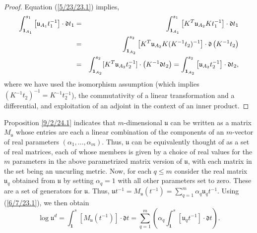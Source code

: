 \documentclass{amsart}
\numberwithin{equation}{section}
\theoremstyle{definition}
\numberwithin{theorem}{section}
\begin{document}
\begin{proof} 
Equation (\ref{5/23/23.1}) implies,
\begin{eqnarray*} \int_{{\bf 1}_{A_1}}^{s_1} \left[\mathfrak{u}_{A_1}t_1^{-1}\right]\cdot \mathfrak{d}t_1 &=& \int_{{\bf 1}_{A_1}}^{s_1} \left[ K^T\mathfrak{u}_{A_2}Kt_1^{-1}\right]\cdot \mathfrak{d}t_1 \\ &=& 
\int_{{\bf 1}_{A_2}}^{s_2} \left[ K^T\mathfrak{u}_{A_2}K (K^{-1}t_2)^{-1}\right]\cdot \mathfrak{d}\left(K^{-1}t_2\right) \\ &=& \int_{{\bf 1}_{A_2}}^{s_2} [K^T\mathfrak{u}_{A_2}t_2^{-1}]\cdot \left(K^{-1}\mathfrak{d}t_2\right) = \int_{{\bf 1}_{A_2}}^{s_2} \left[\mathfrak{u}_{A_2}t_2^{-1}\right]\cdot \mathfrak{d}t_2, 
\end{eqnarray*} 
where we have used the isomorphism assumption (which implies $(K^{-1}t_2)^{-1} = K^{-1}t_2^{-1}$), the commutativity of a linear transformation and a differential, and exploitation of an adjoint in the context of an inner product.
\end{proof}

Proposition \ref{9/2/24.1} indicates that $m$-dimensional $\mathfrak{u}$ can be written as a matrix $M_\mathfrak{u}$ whose entries are each a linear combination of the components of an $m$-vector of real parameters $(\alpha_1, \dots, \alpha_m)$.   Thus, $\mathfrak{u}$ can be equivalently thought of as a set of real matrices, each of whose members is given by a choice of real values for the $m$ parameters in the above parametrized matrix version of $\mathfrak{u}$, with each matrix in the set being an uncurling metric.  Now, for each $q\le m$ consider the real matrix  $\mathfrak{u}_q$ obtained from $\mathfrak{u}$ by setting $\alpha_q =1$ with all other parameters set to zero.  These are a set of generators for $\mathfrak{u}$. Thus, $\mathfrak{u}t^{-1} = M_{\mathfrak{u}}(t^{-1}) = \sum_{q=1}^m \alpha_q \mathfrak{u}_q t^{-1}$.   Using (\ref{6/7/23.1}), we then obtain \begin{equation}\label{9/26/23.1} \log  \mathfrak{u}^d = \int_{\mathbf{1}}^s [M_{\mathfrak{u}} (t^{-1})]\cdot \mathfrak{d}t =\sum_{q=1}^m \left(\alpha_q \int_{\mathbf{1}}^s [\mathfrak{u}_q t^{-1}]\cdot \mathfrak{d}t\right).\end{equation}  
\end{document}
